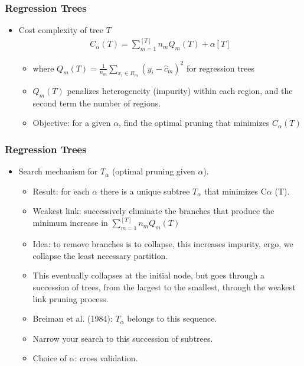 \documentclass[
  shownotes,
  xcolor={svgnames},
  hyperref={colorlinks,citecolor=DarkBlue,linkcolor=DarkRed,urlcolor=DarkBlue}
  ]{beamer}
\begin{document}
\begin{frame}[fragile]
\frametitle{Regression Trees}

\begin{itemize}
\item Cost complexity of tree $T$
\begin{align}
  C_{\alpha}(T)= \sum_{m=1}^{[T]} n_m Q_m (T) + \alpha [T]
\end{align}

  \begin{itemize}
  \item where $Q_m (T)=\frac{1}{n_m} \sum_{x_i\in R_m} (y_i-\hat{c}_m)^2$ for regression trees
  \medskip
  \item  $Q_m (T)$ penalizes heterogeneity (impurity) within each region, and the second term the number of regions.
  \medskip
  \item  Objective: for a given $\alpha$, find the optimal pruning that minimizes $C_{\alpha}(T)$
  \end{itemize}
\end{itemize}
\end{frame}

\begin{frame}[fragile]
\frametitle{Regression Trees}

\begin{itemize}
\item Search mechanism for $T_\alpha$ (optimal pruning given $\alpha$).
\begin{itemize}
\item Result: for each $\alpha$ there is a unique subtree $T_\alpha$ that minimizes C$\alpha$ (T).
\medskip
\item Weakest link: successively eliminate the branches that produce the minimum increase in   $\sum_{m=1}^{[T]} n_m  Q_m (T)$
\medskip
\item Idea: to remove branches is to collapse, this increases impurity, ergo, we collapse the least necessary partition.
\medskip
\item This eventually collapses at the initial node, but goes through a succession of trees, from the largest to the smallest, through the weakest link pruning process.
\medskip
\item Breiman et al. (1984): $T_\alpha$ belongs to this sequence. 
\medskip
\item Narrow your search to this succession of subtrees. 
\medskip
\item Choice of $\alpha$: cross validation.
\end{itemize}

\end{itemize}




\end{frame}
\end{document}
